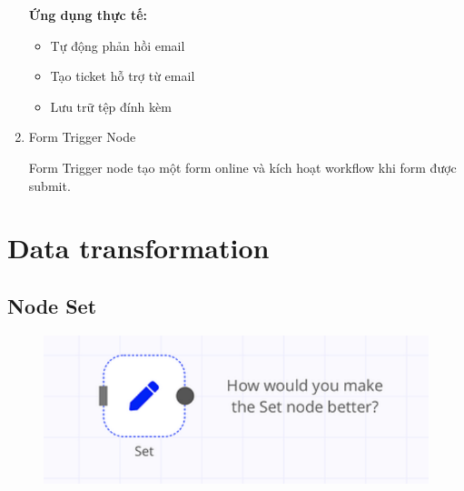 \begin{enumerate}
\textbf{Ứng dụng thực tế:}
\begin{itemize}
    \item Tự động phản hồi email
    \item Tạo ticket hỗ trợ từ email
    \item Lưu trữ tệp đính kèm
\end{itemize}

\item Form Trigger Node

Form Trigger node tạo một form online và kích hoạt workflow khi form được submit.









\end{enumerate}

\newpage
\section{Data transformation}

\subsection{Node Set}
\begin{figure}[htbp]
    \centering
    \includegraphics[width=0.8\linewidth]{Chap1-7/set-node.pdf}
\end{figure}

